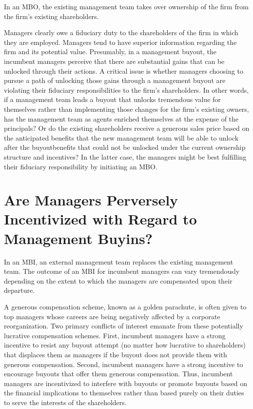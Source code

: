 \documentclass[11pt]{article}
\begin{document}
In an MBO, the existing management team takes over ownership of the firm from the firm's existing shareholders.

Managers clearly owe a fiduciary duty to the shareholders of the firm in which they are employed. Managers tend to have superior information regarding the firm and its potential value. Presumably, in a management buyout, the incumbent managers perceive that there are substantial gains that can be unlocked through their actions. A critical issue is whether managers choosing to pursue a path of unlocking those gains through a management buyout are violating their fiduciary responsibilities to the firm's shareholders. In other words, if a management team leads a buyout that unlocks tremendous value for themselves rather than implementing those changes for the firm's existing owners, has the management team as agents enriched themselves at the expense of the principals? Or do the existing shareholders receive a generous sales price based on the anticipated benefits that the new management team will be able to unlock after the buyoutbenefits that could not be unlocked under the current ownership structure and incentives? In the latter case, the managers might be best fulfilling their fiduciary responsibility by initiating an MBO.

\section*{Are Managers Perversely Incentivized with Regard to Management Buyins?}
In an MBI, an external management team replaces the existing management team. The outcome of an MBI for incumbent managers can vary tremendously depending on the extent to which the managers are compensated upon their departure.

A generous compensation scheme, known as a golden parachute, is often given to top managers whose careers are being negatively affected by a corporate reorganization. Two primary conflicts of interest emanate from these potentially lucrative compensation schemes. First, incumbent managers have a strong incentive to resist any buyout attempt (no matter how lucrative to shareholders) that displaces them as managers if the buyout does not provide them with generous compensation. Second, incumbent managers have a strong incentive to encourage buyouts that offer them generous compensation. Thus, incumbent managers are incentivized to interfere with buyouts or promote buyouts based on the financial implications to themselves rather than based purely on their duties to serve the interests of the shareholders.
\end{document}
